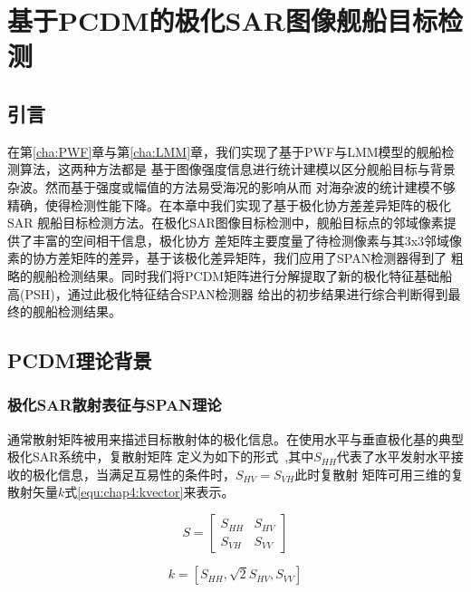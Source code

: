 \chapter{基于PCDM的极化SAR图像舰船目标检测}
\label{cha:PCDM}

\section{引言}
\label{sec:chap4:sec1}
在第\ref{cha:PWF}章与第\ref{cha:LMM}章，我们实现了基于PWF与LMM模型的舰船检测算法，这两种方法都是
基于图像强度信息进行统计建模以区分舰船目标与背景杂波。然而基于强度或幅值的方法易受海况的影响从而
对海杂波的统计建模不够精确，使得检测性能下降。在本章中我们实现了基于极化协方差差异矩阵的极化SAR
舰船目标检测方法。在极化SAR图像目标检测中，舰船目标点的邻域像素提供了丰富的空间相干信息，极化协方
差矩阵主要度量了待检测像素与其3x3邻域像素的协方差矩阵的差异，基于该极化差异矩阵，我们应用了SPAN检测器得到了
粗略的舰船检测结果。同时我们将PCDM矩阵进行分解提取了新的极化特征基础船高(PSH)，通过此极化特征结合SPAN检测器
给出的初步结果进行综合判断得到最终的舰船检测结果。




\section{PCDM理论背景}
\label{sec:chap4:sec2}
\subsection{极化SAR散射表征与SPAN理论}
    通常散射矩阵被用来描述目标散射体的极化信息。在使用水平与垂直极化基的典型极化SAR系统中，复散射矩阵
    定义为如下的形式~\cite{book},其中$S_{HH}$代表了水平发射水平接收的极化信息，当满足互易性的条件时，$S_{HV}=S_{VH}$此时复散射
    矩阵可用三维的复散射矢量$k$式\ref{equ:chap4:kvector}来表示。

    \begin{equation}
        \label{equ:chap4:Smatrix}
        S = \left[ {\begin{array}{*{20}{c}}
        {{S_{HH}}}&{{S_{HV}}}\\
        {{S_{VH}}}&{{S_{VV}}}
        \end{array}} \right]
    \end{equation}

    \begin{equation}
        \label{equ:chap4:kvector}
        k = [{S_{HH}},\sqrt 2 {S_{HV}},{S_{VV}}]
    \end{equation}

